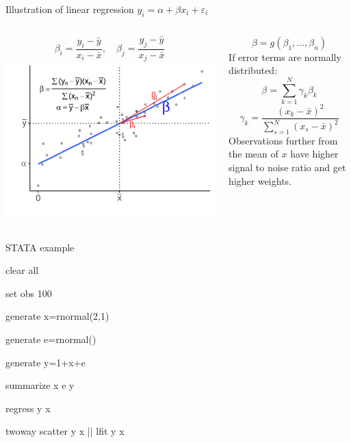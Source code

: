 \documentclass{beamer}
\begin{document}
\begin{frame}{Illustration of linear regression $y_i=\alpha+\beta x_i+\varepsilon_i$}

\begin{columns}
\begin{column}{0.65\linewidth}
\[	\beta_i=\frac{y_i-\bar{y}}{x_i-\bar{x}}, \quad \beta_j=\frac{y_j-\bar{y}}{x_j-\bar{x}}\]
\includegraphics[width=.95\linewidth]{./Figures/plot.png}
\end{column}
\begin{column}{0.35\linewidth}
\[\beta=g(\beta_1,\dots,\beta_n) \] \pause
If error terms are normally distributed:	\[\beta=\sum_{k=1}^N \gamma_k \beta_k\]
\[\gamma_k=\frac{(x_k-\bar{x})^2}{\sum_{s=1}^N(x_s-\bar{x})^2} \]	
Observations further from the mean of $x$ have higher signal to noise ratio and get higher weights.


\end{column}

\end{columns}

\end{frame}

\begin{frame}{STATA example}

\begin{tt}
clear all \medskip

set obs 100  \medskip

generate x=rnormal(2,1) \medskip

generate e=rnormal() \medskip

generate y=1+x+e \medskip

summarize x e y \medskip

regress y x \medskip

twoway scatter y x || lfit y x \medskip
\end{tt}
\end{frame}
\end{document}
